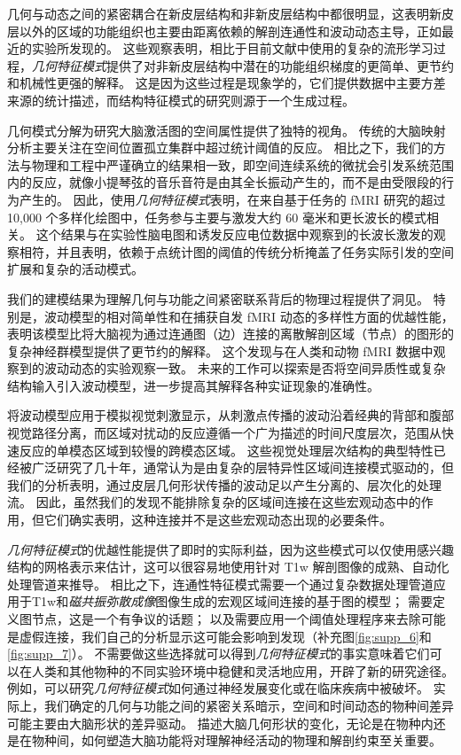 \documentclass[lang=cn,a4paper,newtx]{elegantpaper}
\begin{document}
几何与动态之间的紧密耦合在新皮层结构和非新皮层结构中都很明显，这表明新皮层以外的区域的功能组织也主要由距离依赖的解剖连通性和波动动态主导，正如最近的实验所发现的。
这些观察表明，相比于目前文献中使用的复杂的流形学习过程，\textit{几何特征模式}提供了对非新皮层结构中潜在的功能组织梯度的更简单、更节约和机械性更强的解释。
这是因为这些过程是现象学的，它们提供数据中主要方差来源的统计描述，而结构特征模式的研究则源于一个生成过程。


几何模式分解为研究大脑激活图的空间属性提供了独特的视角。
传统的大脑映射分析主要关注在空间位置孤立集群中超过统计阈值的反应。
相比之下，我们的方法与物理和工程中严谨确立的结果相一致，即空间连续系统的微扰会引发系统范围内的反应，就像小提琴弦的音乐音符是由其全长振动产生的，而不是由受限段的行为产生的。
因此，使用\textit{几何特征模式}表明，在来自基于任务的 fMRI 研究的超过 10,000 个多样化绘图中，任务参与主要与激发大约 60 毫米和更长波长的模式相关。
这个结果与在实验性脑电图和诱发反应电位数据中观察到的长波长激发的观察相符，并且表明，依赖于点统计图的阈值的传统分析掩盖了任务实际引发的空间扩展和复杂的活动模式。


我们的建模结果为理解几何与功能之间紧密联系背后的物理过程提供了洞见。
特别是，波动模型的相对简单性和在捕获自发 fMRI 动态的多样性方面的优越性能，表明该模型比将大脑视为通过连通图（边）连接的离散解剖区域（节点）的图形的复杂神经群模型提供了更节约的解释。
这个发现与在人类和动物 fMRI 数据中观察到的波动动态的实验观察一致。
未来的工作可以探索是否将空间异质性或复杂结构输入引入波动模型，进一步提高其解释各种实证现象的准确性。


将波动模型应用于模拟视觉刺激显示，从刺激点传播的波动沿着经典的背部和腹部视觉路径分离，而区域对扰动的反应遵循一个广为描述的时间尺度层次，范围从快速反应的单模态区域到较慢的跨模态区域。
这些视觉处理层次结构的典型特性已经被广泛研究了几十年，通常认为是由复杂的层特异性区域间连接模式驱动的，但我们的分析表明，通过皮层几何形状传播的波动足以产生分离的、层次化的处理流。
因此，虽然我们的发现不能排除复杂的区域间连接在这些宏观动态中的作用，但它们确实表明，这种连接并不是这些宏观动态出现的必要条件。


\textit{几何特征模式}的优越性能提供了即时的实际利益，因为这些模式可以仅使用感兴趣结构的网格表示来估计，这可以很容易地使用针对 T1w 解剖图像的成熟、自动化处理管道来推导。
相比之下，连通性特征模式需要一个通过复杂数据处理管道应用于T1w和\textit{磁共振弥散成像}图像生成的宏观区域间连接的基于图的模型；
需要定义图节点，这是一个有争议的话题；
以及需要应用一个阈值处理程序来去除可能是虚假连接，我们自己的分析显示这可能会影响到发现（补充图\ref{fig:supp_6}和\ref{fig:supp_7}）。
不需要做这些选择就可以得到\textit{几何特征模式}的事实意味着它们可以在人类和其他物种的不同实验环境中稳健和灵活地应用，开辟了新的研究途径。
例如，可以研究\textit{几何特征模式}如何通过神经发展变化或在临床疾病中被破坏。
实际上，我们确定的几何与功能之间的紧密关系暗示，空间和时间动态的物种间差异可能主要由大脑形状的差异驱动。
描述大脑几何形状的变化，无论是在物种内还是在物种间，如何塑造大脑功能将对理解神经活动的物理和解剖约束至关重要。
\end{document}
